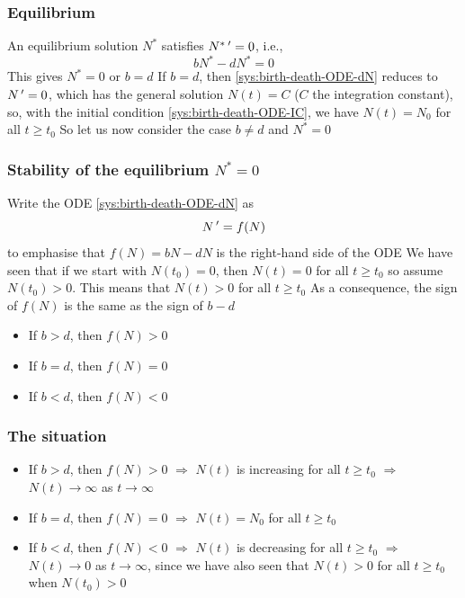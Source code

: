 \documentclass[aspectratio=169]{beamer}
\begin{document}
\begin{frame}
\begin{center}
\end{center}  
\end{frame}

\begin{frame}\frametitle{Equilibrium}
An equilibrium solution $N^*$ satisfies $N^*\,'=0$, i.e.,
\[
bN^*-dN^*=0
\]
\vfill
This gives $N^*=0$ or $b=d$
\vfill 
If $b=d$, then \eqref{sys:birth-death-ODE-dN} reduces to $N\,'=0$, which has the general solution $N(t)=C$ ($C$ the integration constant), so, with the initial condition \eqref{sys:birth-death-ODE-IC}, we have $N(t)=N_0$ for all $t\geq t_0$
\vfill
So let us now consider the case $b\neq d$ and $N^*=0$
\end{frame}

\begin{frame}\frametitle{Stability of the equilibrium $N^*=0$}
Write the ODE \eqref{sys:birth-death-ODE-dN} as
\[
N\,'=f(N)
\]
to emphasise that $f(N)=bN-dN$ is the right-hand side of the ODE
\vfill
We have seen that if we start with $N(t_0)=0$, then $N(t)=0$ for all $t\geq t_0$ so assume $N(t_0)>0$. This means that $N(t)>0$ for all $t\geq t_0$
\vfill
As a consequence, the sign of $f(N)$ is the same as the sign of $b-d$
\begin{itemize}
\item If $b>d$, then $f(N)>0$
\item If $b=d$, then $f(N)=0$
\item If $b<d$, then $f(N)<0$
\end{itemize}
\end{frame}


\begin{frame}\frametitle{The situation}
\begin{itemize}
\item If $b>d$, then $f(N)>0$ $\Rightarrow$ $N(t)$ is increasing for all $t\geq t_0$ $\Rightarrow$ $N(t)\to\infty$ as $t\to\infty$
\vfill
\item If $b=d$, then $f(N)=0$ $\Rightarrow$ $N(t)=N_0$ for all $t\geq t_0$
\vfill
\item If $b<d$, then $f(N)<0$ $\Rightarrow$ $N(t)$ is decreasing for all $t\geq t_0$ $\Rightarrow$ $N(t)\to 0$ as $t\to\infty$, since we have also seen that $N(t)>0$ for all $t\geq t_0$ when $N(t_0)>0$
\end{itemize}
\end{frame}
\end{document}
